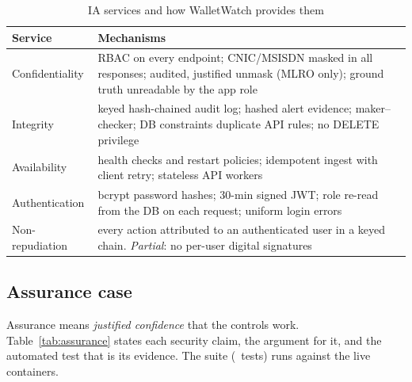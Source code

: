 \documentclass[conference,10pt]{IEEEtran}
\newcommand{\tbl}{\scriptsize\renewcommand{\arraystretch}{1.12}}
\begin{document}
\begin{table}[t]
\caption{IA services and how WalletWatch provides them}\label{tab:pillars}
\centering\tbl
\begin{tabularx}{\columnwidth}{@{}lL@{}}
\toprule
Service & Mechanisms \\ \midrule
Confidentiality & RBAC on every endpoint; CNIC/MSISDN masked in all responses; audited, justified unmask (MLRO only); ground truth unreadable by the app role \\
Integrity & keyed hash-chained audit log; hashed alert evidence; maker--checker; DB constraints duplicate API rules; no DELETE privilege \\
Availability & health checks and restart policies; idempotent ingest with client retry; stateless API workers \\
Authentication & bcrypt password hashes; 30-min signed JWT; role re-read from the DB on each request; uniform login errors \\
Non-repudiation & every action attributed to an authenticated user in a keyed chain. \emph{Partial}: no per-user digital signatures \\
\bottomrule
\end{tabularx}
\end{table}

\subsection{Assurance case}
Assurance means \emph{justified confidence} that the controls work. Table~\ref{tab:assurance}
states each security claim, the argument for it, and the automated test that is its evidence.
The suite (\ResTests\ tests) runs against the live containers.
\end{document}
